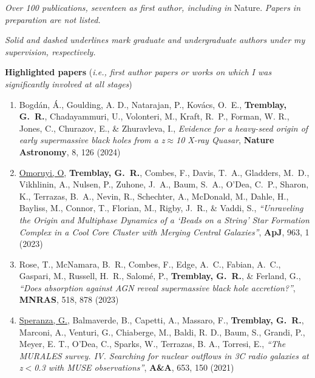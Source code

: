 \documentclass[11pt]{article}
\begin{document}
\textit{Over 100 publications, seventeen as first author, including in} Nature. \textit{Papers in preparation are not listed.}

\textit{Solid and dashed underlines mark graduate and undergraduate authors under my supervision, respectively.}\\

\vspace{-1mm}

\textbf{Highlighted papers} (\textit{i.e., first author papers or works on which I was significantly involved at all stages})\\

\vspace{-4mm}

\begin{enumerate}%

\item Bogd\'{a}n, \'{A}., Goulding, A. D., Natarajan, P., Kov\'{a}cs, O.~E., \textbf{Tremblay, G.~R.}, Chadayammuri, U., Volonteri, M., Kraft, R.~P., Forman, W. R., Jones, C., Churazov, E., \& Zhuravleva, I., \textit{Evidence for a heavy-seed origin of early supermassive black holes from a z$\approx$10 X-ray Quasar}, \textbf{Nature Astronomy}, 8, 126 (2024)

\item \uline{Omoruyi, O}, \textbf{Tremblay, G.~R.}, Combes, F., Davis, T.~A., Gladders, M.~D., Vikhlinin, A., Nulsen, P., Zuhone, J.~A., Baum, S.~A., O'Dea, C.~P., Sharon, K., Terrazas, B.~A., Nevin, R., Schechter, A., McDonald, M., Dahle, H., Bayliss, M., Connor, T., Florian, M., Rigby, J.~R., \& Vaddi, S., \textit{``Unraveling the Origin and Multiphase Dynamics of a `Beads on a String' Star Formation Complex in a Cool Core Cluster with Merging Central Galaxies''}, \textbf{ApJ}, 963, 1 (2023)

\item Rose, T., McNamara, B.~R., Combes, F., Edge, A.~C., Fabian, A.~C., Gaspari, M., Russell, H.~R., Salom\'{e}, P., \textbf{Tremblay, G.~R.}, \& Ferland, G., \textit{``Does absorption against AGN reveal supermassive black hole accretion?''}, \textbf{MNRAS}, 518, 878 (2023)

\item \uline{Speranza, G.}, Balmaverde, B., Capetti, A., Massaro, F., \textbf{Tremblay, G.~R.}, Marconi, A., Venturi, G., Chiaberge, M., Baldi, R. D., Baum, S., Grandi, P., Meyer, E. T., O'Dea, C., Sparks, W., Terrazas, B. A., Torresi, E., \textit{``The MURALES survey. IV. Searching for nuclear outflows in 3C radio galaxies at z$<$0.3 with MUSE observations''}, \textbf{A\&A}, 653, 150 (2021)


\end{enumerate}
\end{document}
